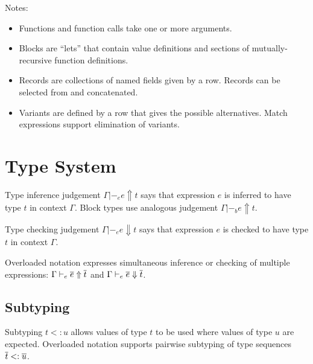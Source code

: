 \documentclass[11pt]{article}
\begin{document}
Notes:
\begin{itemize}
\item Functions and function calls take one or more arguments.
\item Blocks are ``lets'' that contain value definitions and sections of mutually-recursive function definitions.
\item Records are collections of named fields given by a row.
Records can be selected from and concatenated.
\item Variants are defined by a row that gives the possible alternatives.
Match expressions support elimination of variants.
\end{itemize}

\newpage

\section{Type System}

\newcommand{\inft}[4]{#2 |-_#1 #3 \Uparrow #4}
\newcommand{\infe}[3]{\inft{e}{#1}{#2}{#3}}
\newcommand{\infb}[3]{\inft{b}{#1}{#2}{#3}}

\newcommand{\chkt}[4]{#2 |-_#1 #3 \Downarrow #4}
\newcommand{\chke}[3]{\chkt{e}{#1}{#2}{#3}}

\newcommand{\rulename}[1]{{\footnotesize #1}}

\newenvironment{rules}[1]
    {\begin{center}\begin{tabular}{#1}}
    {\end{tabular}\end{center}}

Type inference judgement $\infe{\Gamma}{e}{t}$ says that expression $e$ is inferred to have type $t$ in context $\Gamma$.
Block types use analogous judgement $\infb{\Gamma}{e}{t}$.

Type checking judgement $\chke{\Gamma}{e}{t}$ says that expression $e$ is checked to have type $t$ in context $\Gamma$.

Overloaded notation expresses simultaneous inference or checking of multiple expressions: $\infe{\Gamma}{\repo{e}}{\repo{t}}$ and $\chke{\Gamma}{\repo{e}}{\repo{t}}$.

\subsection{Subtyping}

\newcommand{\subtype}[2]{#1 <: #2}

Subtyping $\subtype{t}{u}$ allows values of type $t$ to be used where values of type $u$ are expected.
Overloaded notation supports pairwise subtyping of type sequences $\subtype{\repo{t}}{\repo{u}}$.
\end{document}
